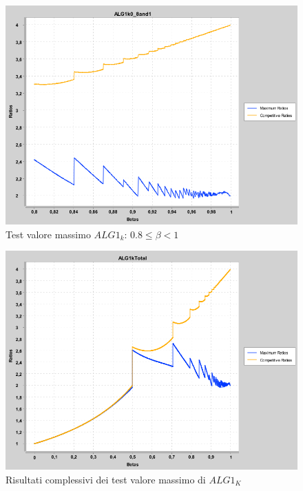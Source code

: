 \documentclass[twoside,openany,titlepage,fleqn,
	headinclude,12pt,a4paper,BCOR5mm,footinclude]{scrbook}
\begin{document}
\begin{figure}[H]
\caption{Test valore massimo $ALG1_{k}$: $0.8 \leq \beta < 1$}
\centering
\includegraphics[scale=0.4]{max/ALG1k0_8and1.png}
\end{figure}
\begin{figure}[H]
\caption[Unione test valore massimo $ALG1_{K}$]{Risultati complessivi dei test valore massimo di $ALG1_{K}$}
\centering
\includegraphics[scale=0.4]{max/ALG1kTotal.png}
\end{figure}
\end{document}
